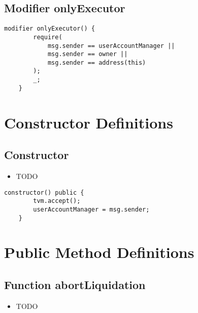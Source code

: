 \subsection{Modifier onlyExecutor}


\begin{lstlisting}[firstnumber=427]
    modifier onlyExecutor() {
        require(
            msg.sender == userAccountManager ||
            msg.sender == owner ||
            msg.sender == address(this)
        );
        _;
    }
\end{lstlisting}

\section{Constructor Definitions}


\subsection{Constructor}

\noindent\begin{itemize}
\item TODO
\end{itemize}

\begin{lstlisting}[firstnumber=49]
    constructor() public { 
        tvm.accept();
        userAccountManager = msg.sender;
    }
\end{lstlisting}

\section{Public Method Definitions}


\subsection{Function abortLiquidation}

\noindent\begin{itemize}
\item TODO
\end{itemize}

